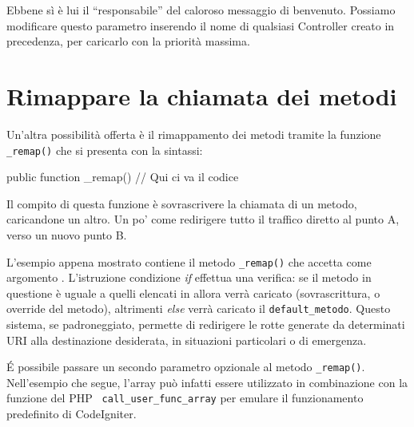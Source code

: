 
Ebbene sì è lui il ``responsabile'' del caloroso messaggio di benvenuto. Possiamo modificare questo parametro inserendo il nome di qualsiasi Controller creato in precedenza, per caricarlo con la priorità massima.

\section*{Rimappare la chiamata dei metodi}
Un'altra possibilità offerta è il rimappamento dei metodi tramite la funzione \verb|_remap()| che si presenta con la sintassi:

\begin{code}
public function _remap()
{
    // Qui ci va il codice
}
\end{code}

Il compito di questa funzione è sovrascrivere la chiamata di un metodo, caricandone un altro. Un po' come redirigere tutto il traffico diretto al punto A, verso un nuovo punto B.


L'esempio appena mostrato contiene il metodo \verb|_remap()| che accetta come argomento . L'istruzione condizione \emph{if} effettua una verifica: se il metodo in questione è uguale a quelli elencati in  allora verrà caricato  (sovrascrittura, o override del metodo), altrimenti \emph{else} verrà caricato il \verb|default_metodo|. Questo sistema, se padroneggiato, permette di redirigere le rotte generate da determinati \ac{URI} alla destinazione desiderata, in situazioni particolari o di emergenza.

\'E possibile passare un secondo parametro opzionale al metodo \verb|_remap()|. Nell'esempio che segue, l'array può infatti essere utilizzato in combinazione con la funzione del \ac{PHP} \verb| call_user_func_array| per emulare il funzionamento predefinito di CodeIgniter.


